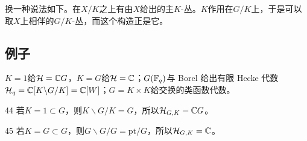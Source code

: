 换一种说法如下。在$X/K$之上有由$X$给出的主$K$-丛。$K$作用在$G/K$上，于是可以取$X$上相伴的$G/K$-丛，而这个构造正是它。

\subsection{例子}
\begin{sectionkey}
$K=1$给$\mathcal{H}=\mathbb{C} G$，$K=G$给$\mathcal{H}=\mathbb{C}$；$G(\mathbb{F}_q)$与 Borel 给出有限 Hecke 代数$\mathcal{H}_q=\mathbb{C}[K\backslash G/K]=\mathbb{C}[W]$；$G=K\times K$给交换的类函数代数。
\end{sectionkey}

\begin{srcex}{44}
若$K=1\subset G$，则$K\backslash G/K=G$，所以$\mathcal{H}_{G,K}=\mathbb{C} G$。
\end{srcex}

\begin{srcex}{45}
若$K=G\subset G$，则$G\backslash G/G=\mathrm{pt}/G$，所以$\mathcal{H}_{G,K}=\mathbb{C}$。
\end{srcex}


